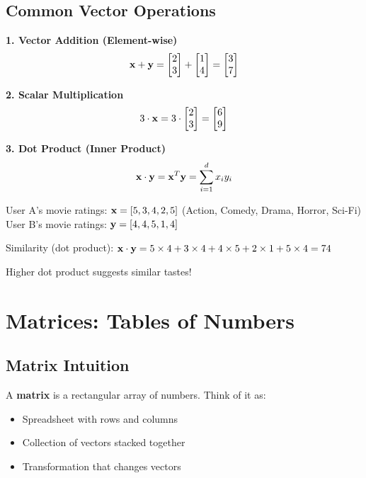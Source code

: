 \documentclass{article}
\newcounter{example}
\begin{document}
\subsection{Common Vector Operations}

\textbf{1. Vector Addition (Element-wise)}
$$\mathbf{x} + \mathbf{y} = \begin{bmatrix} 2 \\ 3 \end{bmatrix} + \begin{bmatrix} 1 \\ 4 \end{bmatrix} = \begin{bmatrix} 3 \\ 7 \end{bmatrix}$$

\textbf{2. Scalar Multiplication}
$$3 \cdot \mathbf{x} = 3 \cdot \begin{bmatrix} 2 \\ 3 \end{bmatrix} = \begin{bmatrix} 6 \\ 9 \end{bmatrix}$$

\textbf{3. Dot Product (Inner Product)}
$$\mathbf{x} \cdot \mathbf{y} = \mathbf{x}^T \mathbf{y} = \sum_{i=1}^d x_i y_i$$

\begin{tcolorbox}[colback=orange!5!white,colframe=orange!75!black,title=Example \stepcounter{example}\#\theexample: Movie Recommendation Dot Product]
User A's movie ratings: $\mathbf{x} = [5, 3, 4, 2, 5]$ (Action, Comedy, Drama, Horror, Sci-Fi)\\
User B's movie ratings: $\mathbf{y} = [4, 4, 5, 1, 4]$

Similarity (dot product): $\mathbf{x} \cdot \mathbf{y} = 5 \times 4 + 3 \times 4 + 4 \times 5 + 2 \times 1 + 5 \times 4 = 74$

Higher dot product suggests similar tastes!
\end{tcolorbox}

\section{Matrices: Tables of Numbers}

\subsection{Matrix Intuition}

A \textbf{matrix} is a rectangular array of numbers. Think of it as:
\begin{itemize}
    \item Spreadsheet with rows and columns
    \item Collection of vectors stacked together
    \item Transformation that changes vectors
\end{itemize}
\end{document}

